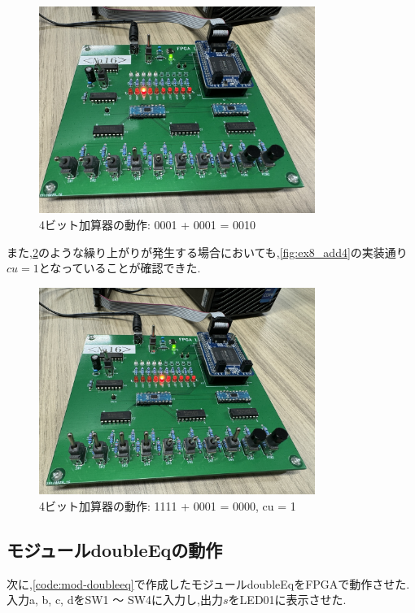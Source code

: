 \documentclass[autodetect-engine, dvi=dvipdfmx, 10pt, a4paper, ja=standard]{bxjsarticle}
\begin{document}
\begin{figure}[H]
	\centering
	\includegraphics[width=0.8\textwidth]{ex8_add4_0001_0001.jpeg}
	\caption{4ビット加算器の動作: 0001 + 0001 = 0010}
	\label{fig:ex8_add4_0001_0001}
\end{figure}

また,\ref{fig:ex8_add4_1111_0001}のような繰り上がりが発生する場合においても,\ref{fig:ex8_add4}の実装通り$cu = 1$となっていることが確認できた.

\begin{figure}[H]
	\centering
	\includegraphics[width=0.8\textwidth]{ex8_add4_1111_0001.jpeg}
	\caption{4ビット加算器の動作: 1111 + 0001 = 0000, cu = 1}
	\label{fig:ex8_add4_1111_0001}
\end{figure}

\subsection{モジュールdoubleEqの動作}

次に,\ref{code:mod-doubleeq}で作成したモジュールdoubleEqをFPGAで動作させた.
入力a, b, c, dをSW1 ～ SW4に入力し,出力$s$をLED01に表示させた.
\end{document}
